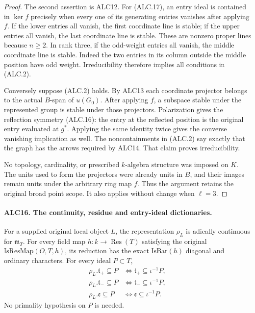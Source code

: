 \documentclass[11pt,a4paper]{article}
\numberwithin{equation}{section}
\theoremstyle{remark}\newtheorem{remark}[theorem]{Remark}
\begin{document}
\begin{proof}
The second assertion is ALC12.  For (ALC.17), an entry ideal
is contained in \(\ker f\) precisely when every one of
its generating entries vanishes after applying \(f\).
If the lower entries all vanish, the first coordinate line
is stable; if the upper entries all vanish, the last
coordinate line is stable.  These are nonzero proper lines
because \(n\ge2\).  In rank three, if the odd-weight
entries all vanish, the middle coordinate line is stable.
Indeed the two entries in its column outside the middle
position have odd weight.  Irreducibility therefore implies
all conditions in (ALC.2).

Conversely suppose (ALC.2) holds.  By ALC13 each coordinate
projector belongs to the actual \(B\)-span of \(u(G_0)\).
After applying \(f\), a subspace stable under the represented
group is stable under those projectors.  Polarization gives
the reflection symmetry (ALC.16): the entry at the reflected
position is the original entry evaluated at \(g^*\).
Applying the same identity twice gives the converse vanishing
implication as well.  The noncontainments in (ALC.2) say
exactly that the graph has the arrows required by ALC14.
That claim proves irreducibility.

No topology, cardinality, or prescribed \(k\)-algebra
structure was imposed on \(K\).  The units used to form
the projectors were already units in \(B\), and their
images remain units under the arbitrary ring map \(f\).
Thus the argument retains the original broad point scope.
It also applies without change when \(\ell=3\).
\end{proof}

\paragraph{ALC16. The continuity, residue and entry-ideal dictionaries.}
\label{claim:ALC16}
For a supplied original local object \(L\), the representation
\(\rho_L\) is adically continuous for \(\mathfrak m_T\).
For every field map \(h:k\to\operatorname{Res}(T)\)
satisfying the original \(\mathrm{IsResMap}(O,T,h)\), its
reduction has the exact \(\mathrm{IsBar}(h)\) diagonal and
ordinary characters.  For every ideal \(P\subset T\),
\[
 \begin{aligned}
 \rho_L.\mathfrak t_+\subseteq P
       &\Longleftrightarrow \mathfrak t_+\subseteq\iota^{-1}P,\\
 \rho_L.\mathfrak t_-\subseteq P
       &\Longleftrightarrow \mathfrak t_-\subseteq\iota^{-1}P,\\
 \rho_L.\mathfrak e\subseteq P
       &\Longleftrightarrow \mathfrak e\subseteq\iota^{-1}P.
 \end{aligned}                                             \tag{ALC.18}
\]
No primality hypothesis on \(P\) is needed.
\end{document}
